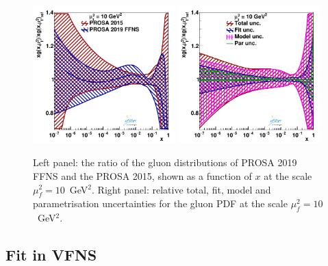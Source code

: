 \documentclass[12pt]{article}
\begin{document}
\begin{figure}
    \centering
    \includegraphics[width=0.49\textwidth]{figs/q2_10_pdf_g_ratio.pdf}
    \includegraphics[width=0.49\textwidth]{figs/gluonunc.pdf}
    \caption{Left panel: the ratio of the gluon distributions of PROSA 2019 FFNS and the PROSA 2015, shown as a function of $x$ at the scale $\mu^2_f=10$~GeV$^2$. Right panel: relative total, fit, model and parametrisation uncertainties for the gluon PDF at the scale $\mu^2_f=10$~GeV$^2$.}
    \label{fig:pdfratios}
\end{figure}


\subsection{Fit in VFNS}
\label{sec:vfns}
\end{document}
